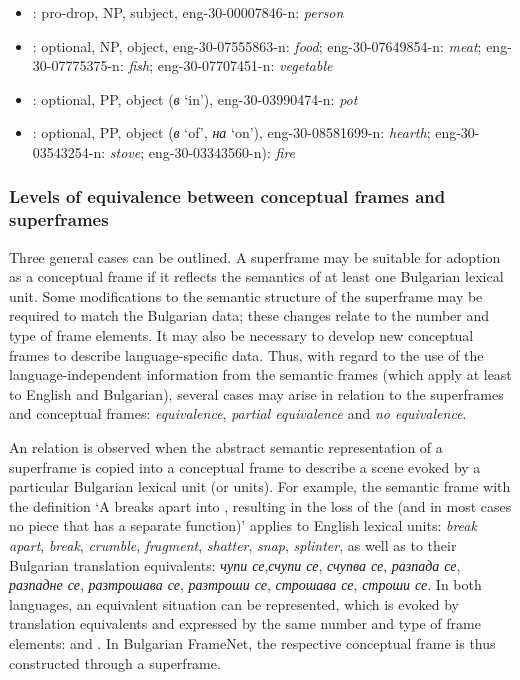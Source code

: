 \documentclass[output=paper,colorlinks,citecolor=brown]{langscibook}
\begin{document}
\begin{itemize}
    \item   {}: pro-drop, NP, subject,  eng-30-00007846-n: \textit{person} 
   \item   {}: optional, NP, object, eng-30-07555863-n: \textit{food};   eng-30-07649854-n: \textit{meat};  eng-30-07775375-n: \textit{fish};  eng-30-07707451-n: \textit{vegetable}
  \item {}: optional, PP, object (\textit{в} `in'),  eng-30-03990474-n: \textit{pot}
 \item  {}: optional, PP, object (\textit{в} `of', \textit{на} `on'), \newline eng-30-08581699-n: \textit{hearth}; eng-30-03543254-n: \textit{stove};  eng-30-03343560-n): \textit{fire}

\end{itemize}

\subsubsection{Levels of equivalence between conceptual frames and superframes}

Three general cases can be outlined. A superframe may be suitable for adoption as a conceptual frame if it reflects the semantics of at least one Bulgarian lexical unit. Some modifications to the semantic structure of the superframe may be required to match the Bulgarian data; these changes relate to the number and type of frame elements. It may also be necessary to develop new conceptual frames to describe language-specific data.
Thus, with regard to the use of the language-independent information from the semantic frames (which apply at least to English and Bulgarian), several cases may arise in relation to the superframes and conceptual frames: \emph{equivalence}, \emph{partial equivalence} and \emph{no equivalence}.

An  relation is observed when the abstract semantic representation of a superframe is copied into a conceptual frame to describe a scene evoked by a particular Bulgarian lexical unit (or units).
For example, the semantic frame  with the definition `A  breaks apart into , resulting in the loss of the  (and in most cases no piece that has a separate function)' applies to English lexical units: \textit{break apart}, \textit{break}, \textit{crumble}, \textit{fragment}, \textit{shatter}, \textit{snap}, \textit{splinter}, as well as to their Bulgarian translation equivalents: \textit{чупи се},\textit{счупи се}, \textit{счупва се}, \textit{разпада се}, \textit{разпадне се}, \textit{разтрошава се}, \textit{разтроши се}, \textit{строшава се}, \textit{строши се}. In both languages, an equivalent situation can be represented, which is evoked by translation equivalents and expressed by the same number and type of frame elements:  and . In Bulgarian FrameNet, the respective conceptual frame is thus constructed through a superframe.
\end{document}
